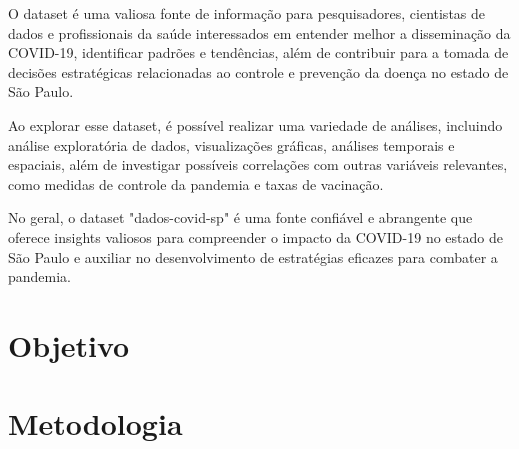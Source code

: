 \documentclass[12pt, 
oneside,		  
a4paper,			
english,			
brazil				 
]{article}
\begin{document}
O dataset é uma valiosa fonte de informação para pesquisadores, cientistas de dados e profissionais da saúde interessados em entender melhor a disseminação da COVID-19, identificar padrões e tendências, além de contribuir para a tomada de decisões estratégicas relacionadas ao controle e prevenção da doença no estado de São Paulo.

Ao explorar esse dataset, é possível realizar uma variedade de análises, incluindo análise exploratória de dados, visualizações gráficas, análises temporais e espaciais, além de investigar possíveis correlações com outras variáveis relevantes, como medidas de controle da pandemia e taxas de vacinação.

No geral, o dataset "dados-covid-sp" é uma fonte confiável e abrangente que oferece insights valiosos para compreender o impacto da COVID-19 no estado de São Paulo e auxiliar no desenvolvimento de estratégias eficazes para combater a pandemia.

\section{Objetivo}



\section{Metodologia}

\end{document}

